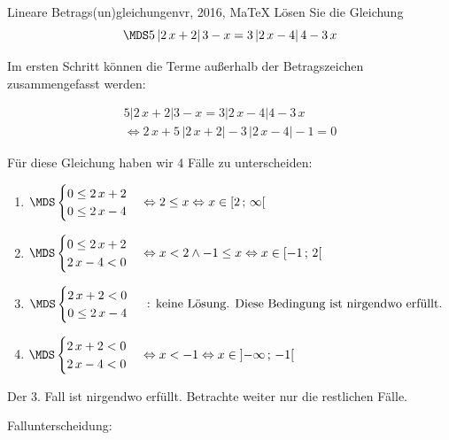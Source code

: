  \providecommand{\MoIl}[1][]{\mbox{}#1]\mathopen{}} 
 \providecommand{\MoIr}[1][]{#1[\mbox{}} 
 \providecommand{\MIntvlSep}{;} 
 \providecommand{\MElSetSep}{\, ; \, } 
 \begin{MAufgabe}{Lineare Betrags(un)gleichungen}{vr, 2016, MaTeX}
L\"osen Sie die Gleichung
$$
 \MDS 5\left| 2\, x + 2 \right|3 - x= 3 \left| 2\, x - 4 \right| 4 - 3\, x
$$  

\ifLsg\MLoesung

Im ersten Schritt k\"onnen die Terme au\ss{}erhalb der Betragszeichen zusammengefasst werden:

\begin{align*} 
 5\left| 2\, x + 2 \right|3 - x= 3 \left| 2\, x - 4 \right| 4 - 3\, x\\ 
\Leftrightarrow2\, x + 5\, \left|2\, x + 2\right| - 3\, \left|2\, x - 4\right| - 1= 0 
 \end{align*}

F\"ur diese Gleichung haben wir 4 F\"alle zu unterscheiden: 
\begin{enumerate}
\item $ \MDS 
\begin{cases} 
 0 \leq 2\, x + 2\\ 
0 \leq 2\, x - 4
 \end{cases}
\Leftrightarrow 2 \leq x\Leftrightarrow x \in [ 2 \, \MIntvlSep \, \infty\MoIr $ 
\item $ \MDS 
\begin{cases} 
 0 \leq 2\, x + 2\\ 
2\, x - 4 < 0
 \end{cases}
\Leftrightarrow x < 2 \wedge -1 \leq x\Leftrightarrow x \in [ -1 \, \MIntvlSep \, 2\MoIr $ 
\item $ \MDS 
\begin{cases} 
 2\, x + 2 < 0\\ 
0 \leq 2\, x - 4
 \end{cases}
 \mbox{ : keine L\"osung. Diese Bedingung ist nirgendwo erf\"ullt.}$ 
\item $ \MDS 
\begin{cases} 
 2\, x + 2 < 0\\ 
2\, x - 4 < 0
 \end{cases}
\Leftrightarrow x < -1\Leftrightarrow x \in \MoIl  -\infty \, \MIntvlSep \, -1\MoIr $ 
\end{enumerate} 
Der 3. Fall ist nirgendwo erf\"ullt. Betrachte weiter nur die restlichen F\"alle.
 
 Fallunterscheidung: 


\end{MAufgabe}
